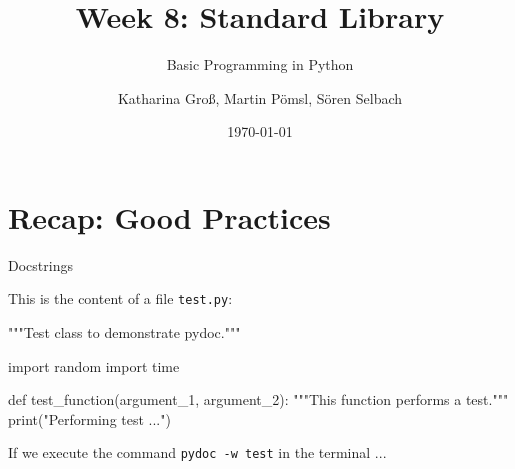



\title[Standard Library]{Week 8: Standard Library}
\subtitle{Basic Programming in Python}

\author[kgross, mpoemsl, sselbach]{Katharina Groß, Martin Pömsl, Sören Selbach}

\date{\today}

\begin{frame}[plain]
    \titlepage
\end{frame}

\begin{frame}
    \tableofcontents
\end{frame}


\section{Recap: Good Practices}

\begin{frame}[plain]
    \sectionpage
\end{frame}

\begin{frame}[fragile]{Docstrings}

    This is the content of a file \texttt{test.py}:

    \begin{pythoncode}

"""Test class to demonstrate pydoc."""

import random
import time

def test_function(argument_1, argument_2):
    """This function performs a test."""
    print("Performing test ...")

    \end{pythoncode}

    If we execute the command \texttt{pydoc -w test} in the terminal ...


\end{frame}



